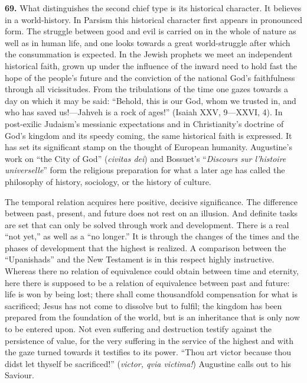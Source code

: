 \documentclass[12pt,a4paper]{book}
\newcommand{\opage}[1]{\marginnote{\footnotesize\textit{[#1]}}}
\begin{document}
\noindent\textbf{69.} What distinguishes the second chief type is its historical character. It
believes in a world-history. In Parsism this historical character first appears in pronounced
form. The struggle between good and evil is carried on in the whole of nature as well as in
human life, and one looks towards a great world-struggle after which the consummation is
expected. In the Jewish prophets we meet an independent historical faith, grown up under the
influence of the inward need to hold fast the hope of the people's future and the conviction of
the national God's faithfulness through all vicissitudes. From the tribulations of the time one
gazes towards a day on which it may be said: ``Behold, this is our God, whom we trusted in, and
who has saved us!---Jahveh is a rock of ages!'' (Isaiah XXV, 9---XXVI, 4). In post-exilic
Judaism's messianic expectations and in Christianity's doctrine of 
\opage{159}God's kingdom and its speedy
coming, the same historical faith is expressed. It has set its significant stamp on the thought
of European humanity. Augustine's work on ``the City of God'' (\textit{civitas dei}) and
Bossuet's ``\emph{Discours sur l'histoire universelle}'' form the religious preparation for what
a later age has called the philosophy of history, sociology, or the history of culture.

The temporal relation acquires here positive, decisive significance. The difference between past,
present, and future does not rest on an illusion. And definite tasks are set that can only be
solved through work and development. There is a real ``not yet,'' as well as a ``no longer.'' It
is through the changes of the times and the phases of development that the highest is realized. A
comparison between the ``Upanishads'' and the New Testament is in this respect highly instructive.
Whereas there no relation of equivalence could obtain between time and eternity, here there is
supposed to be a relation of equivalence between past and future: life is won by being lost; there
shall come thousandfold compensation for what is sacrificed; Jesus has not come to dissolve but to
fulfil; the kingdom has been prepared from the foundation of the world, but is an inheritance that
is only now to be entered upon. Not even suffering and destruction testify against the persistence
of value, for the very suffering in the service of the highest and with the gaze turned towards it
testifies to its power. ``Thou art victor because thou didst let thyself be sacrificed!''
(\textit{victor, qvia victima!}) Augustine calls out to his Saviour.
\end{document}
